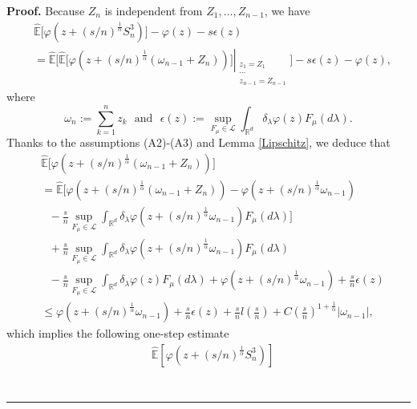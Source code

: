 \documentclass[a4paper,oneside,10pt]{article}%
\newenvironment{proof}[1][Proof]{\noindent \textbf{#1.} }{\  \rule{0.5em}{0.5em}}
\numberwithin{equation}{section}
\begin{document}
\begin{proof}
Because $Z_{n}$ is independent from $Z_{1},\dots,Z_{n-1}$, we have
\begin{align*}
&  \mathbb{\hat{E}}\bigg[\varphi \left(  z+(s/n)^{\frac{1}{\alpha}}S_{n}%
^{3}\right)  \bigg]-\varphi(z)-s\epsilon(z)\\
&  =\mathbb{\hat{E}}\bigg[\left.  \mathbb{\hat{E}}\bigg[\varphi \left(
z+(s/n)^{\frac{1}{\alpha}}(\omega_{n-1}+Z_{n})\right)  \bigg]\right \vert
_{\substack{z_{1}=Z_{1}\\ \cdots \\z_{n-1}=Z_{n-1}}}\bigg]-s\epsilon
(z)-\varphi(z),
\end{align*}
where
\[
\omega_{n}:=\sum \limits_{k=1}^{n}z_{k}\  \  \  \text{and}\  \  \  \epsilon
(z):=\sup \limits_{F_{\mu}\in \mathcal{L}}\int_{\mathbb{R}^{d}}\delta_{\lambda
}\varphi(z)F_{\mu}(d\lambda).
\]
Thanks to the assumptions (A2)-(A3) and Lemma \ref{Lipschitz}, we deduce that
\begin{align*}
&  \mathbb{\hat{E}}\bigg[\varphi \left(  z+(s/n)^{\frac{1}{\alpha}}%
(\omega_{n-1}+Z_{n})\right)  \bigg]\\
&  =\mathbb{\hat{E}}\bigg[\varphi \left(  z+(s/n)^{\frac{1}{\alpha}}%
(\omega_{n-1}+Z_{n})\right)  -\varphi \left(  z+(s/n)^{\frac{1}{\alpha}}%
\omega_{n-1}\right) \\
&  \text{ \  \ }-\frac{s}{n}\sup \limits_{F_{\mu}\in \mathcal{L}}\int
_{\mathbb{R}^{d}}\delta_{\lambda}\varphi \left(  z+(s/n)^{\frac{1}{\alpha}%
}\omega_{n-1}\right)  F_{\mu}(d\lambda)\bigg]\\
&  \text{ \  \ }+\frac{s}{n}\sup \limits_{F_{\mu}\in \mathcal{L}}\int
_{\mathbb{R}^{d}}\delta_{\lambda}\varphi \left(  z+(s/n)^{\frac{1}{\alpha}%
}\omega_{n-1}\right)  F_{\mu}(d\lambda)\\
&  \text{ \  \ }-\frac{s}{n}\sup \limits_{F_{\mu}\in \mathcal{L}}\int
_{\mathbb{R}^{d}}\delta_{\lambda}\varphi \left(  z\right)  F_{\mu}%
(d\lambda)+\varphi \left(  z+(s/n)^{\frac{1}{\alpha}}\omega_{n-1}\right)
+\frac{s}{n}\epsilon(z)\\
&  \leq \varphi \left(  z+(s/n)^{\frac{1}{\alpha}}\omega_{n-1}\right)  +\frac
{s}{n}\epsilon(z)+\frac{s}{n}l\left(  \frac{s}{n}\right)  +C\left(  \frac
{s}{n}\right)  ^{1+\frac{1}{\alpha}}\left \vert \omega_{n-1}\right \vert ,
\end{align*}
which implies the following one-step estimate
\begin{align*}
&  \mathbb{\hat{E}}\left[  \varphi \left(  z+(s/n)^{\frac{1}{\alpha}}S_{n}%
^{3}\right)  \right] \\

\end{align*}
\end{proof}
\end{document}
